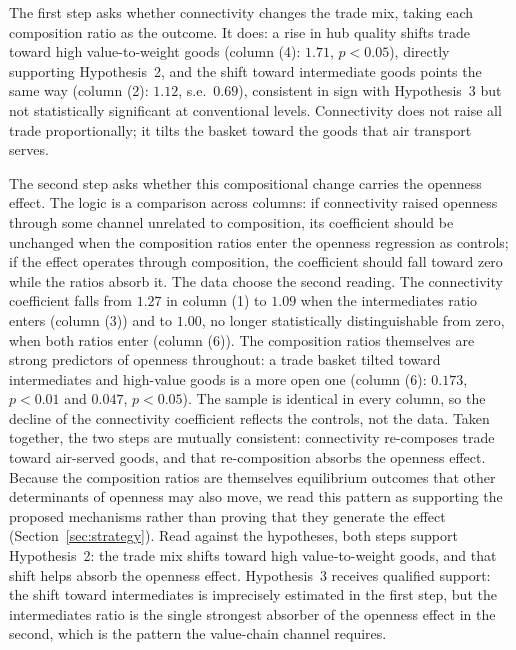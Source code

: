 The first step asks whether connectivity changes the trade mix, taking
each composition ratio as the outcome. It does: a rise in hub quality
shifts trade toward high value-to-weight goods (column (4): $1.71$,
$p<0.05$), directly supporting Hypothesis~2, and the shift toward
intermediate goods points the same way (column (2): $1.12$, s.e.\
$0.69$), consistent in sign with Hypothesis~3 but not statistically
significant at conventional levels. Connectivity does not raise all
trade proportionally; it tilts the basket toward the goods that air
transport serves.

The second step asks whether this compositional change carries the
openness effect. The logic is a comparison across columns: if
connectivity raised openness through some channel unrelated to
composition, its coefficient should be unchanged when the composition
ratios enter the openness regression as controls; if the effect operates
through composition, the coefficient should fall toward zero while the
ratios absorb it. The data choose the second reading. The connectivity
coefficient falls from $1.27$ in column (1) to $1.09$ when the
intermediates ratio enters (column (3)) and to $1.00$, no longer
statistically distinguishable from zero, when both ratios enter (column
(6)). The composition ratios themselves are strong predictors of
openness throughout: a trade basket tilted toward intermediates and
high-value goods is a more open one (column (6): $0.173$, $p<0.01$ and
$0.047$, $p<0.05$). The sample is identical in every column, so the
decline of the connectivity coefficient reflects the controls, not the
data. Taken together, the two steps are mutually consistent: connectivity
re-composes trade toward air-served goods, and that re-composition absorbs
the openness effect. Because the composition ratios are themselves
equilibrium outcomes that other determinants of openness may also move,
we read this pattern as supporting the proposed mechanisms rather than
proving that they generate the effect
(Section~\ref{sec:strategy}). Read against the hypotheses, both
steps support Hypothesis~2: the trade mix shifts toward high
value-to-weight goods, and that shift helps absorb the openness effect.
Hypothesis~3 receives qualified support: the shift toward intermediates
is imprecisely estimated in the first step, but the intermediates ratio
is the single strongest absorber of the openness effect in the second,
which is the pattern the value-chain channel requires.

